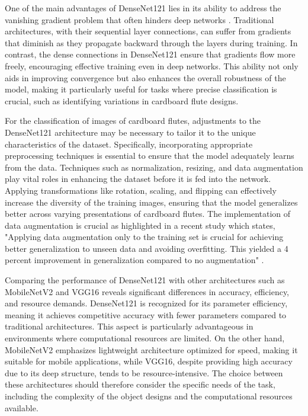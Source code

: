 One of the main advantages of DenseNet121 lies in its ability to address the vanishing gradient problem that often hinders deep networks \cite{bengio1994learning} . Traditional architectures, with their sequential layer connections, can suffer from gradients that diminish as they propagate backward through the layers during training. In contrast, the dense connections in DenseNet121 ensure that gradients flow more freely, encouraging effective training even in deep networks. This ability not only aids in improving convergence but also enhances the overall robustness of the model, making it particularly useful for tasks where precise classification is crucial, such as identifying variations in cardboard flute designs.


For the classification of images of cardboard flutes, adjustments to the DenseNet121 architecture may be necessary to tailor it to the unique characteristics of the dataset. Specifically, incorporating appropriate preprocessing techniques is essential to ensure that the model adequately learns from the data. Techniques such as normalization, resizing, and data augmentation play vital roles in enhancing the dataset before it is fed into the network. Applying transformations like rotation, scaling, and flipping can effectively increase the diversity of the training images, ensuring that the model generalizes better across varying presentations of cardboard flutes. The implementation of data augmentation is crucial as highlighted in a recent study which states, "Applying data augmentation only to the training set is crucial for achieving better generalization to unseen data and avoiding overfitting. This yielded a 4 percent improvement in generalization compared to no augmentation" \cite{krizhevsky2012imagenet}.


Comparing the performance of DenseNet121 with other architectures such as MobileNetV2 and VGG16 reveals significant differences in accuracy, efficiency, and resource demands. DenseNet121 is recognized for its parameter efficiency, meaning it achieves competitive accuracy with fewer parameters compared to traditional architectures. This aspect is particularly advantageous in environments where computational resources are limited. On the other hand, MobileNetV2 emphasizes lightweight architecture optimized for speed, making it suitable for mobile applications, while VGG16, despite providing high accuracy due to its deep structure, tends to be resource-intensive. The choice between these architectures should therefore consider the specific needs of the task, including the complexity of the object designs and the computational resources available.



